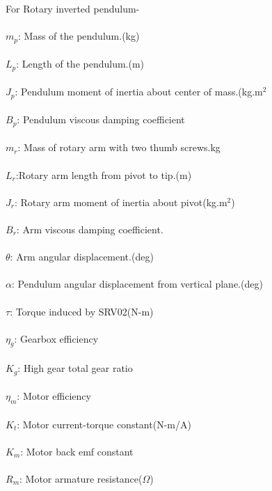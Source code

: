 \begin{SingleSpace}
\begin{minipage}{8cm}
\end{minipage}
\hspace{1cm}
%
\begin{minipage}{8cm}
    \vspace{5mm}
   \large{For Rotary inverted pendulum-}\\
   \\$m_p$: Mass of the pendulum.(kg) \\
   \\$L_p$: Length of the pendulum.(m)\\
   \\$J_{p}$: Pendulum moment of inertia about center of mass.(kg.m$^2$\\
   \\$B_p$: Pendulum viscous damping coefficient\\
   \\$m_{r}$: Mass of rotary arm with two thumb screws.{kg} \\
   \\$L_r$:Rotary arm length from pivot to tip.(m) \\
   \\$J_r$: Rotary arm moment of inertia about pivot(kg.m$^2$)\\
   \\$B_r$: Arm viscous damping coefficient.\\
   \\$\theta$: Arm angular displacement.(deg) \\
   \\$\alpha$: Pendulum angular displacement from vertical plane.(deg)\\
   \\$\tau$: Torque induced by SRV02(N-m)\\
   \\$\eta_g$: Gearbox efficiency\\
   \\$K_g$: High gear total gear ratio\\
   \\$\eta_m$: Motor efficiency\\
   \\$K_t$: Motor current-torque constant(N-m/A)\\
   \\$K_m$: Motor back emf constant\\
   \\$R_m$: Motor armature resistance($\Omega$)\\
   \end{minipage}
\end{SingleSpace}
\clearpage
